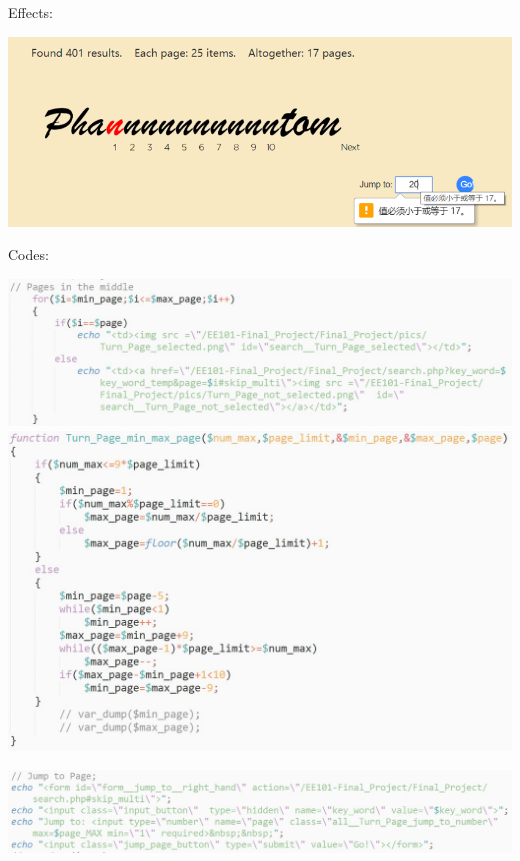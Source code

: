 \documentclass[10pt,twoside,a4paper,titlepage]{article}
\begin{document}
		Effects:\newline\par
		\includegraphics[width=1\textwidth]{gzl/05.png}\newline\par
		Codes:\newline\par
		\includegraphics[width=1\textwidth]{gzl/04.jpg}
		\newpage
		\includegraphics[width=1\textwidth]{gzl/05.jpg}\newline\par
		\includegraphics[width=1\textwidth]{gzl/06.jpg}\newline\par
\end{document}
